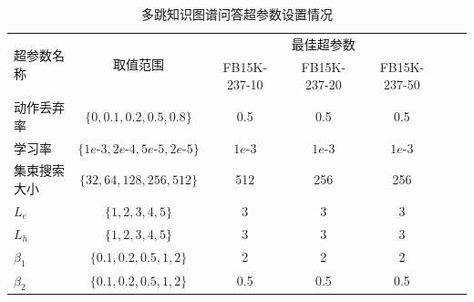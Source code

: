 \documentclass[algorithmlist, AutoFakeBold, AutoFakeSlant, figurelist, tablelist, nomlist, masters]{seuthesix}
\begin{document}
\begin{table}[]
  \centering
  \begin{tabular*}{0.95\textwidth}{@{\extracolsep{\fill}}lcccccc}
  \toprule[1pt]
  \multirow{2}{*}{超参数名称} & \multirow{2}{*}{取值范围} & \multicolumn{3}{c}{最佳超参数}\\ 
    &  & \small{FB15K-237-10} & \small{FB15K-237-20} & \small{FB15K-237-50} \\ \hline
  动作丢弃率 & $\{0, 0.1, 0.2, 0.5, 0.8\}$ & 0.5 & 0.5 & 0.5 \\
  学习率 & $\{1e\text{-}3, 2e\text{-}4, 5e\text{-}5, 2e\text{-}5\}$ & $1e\text{-}3$ & $1e\text{-}3$ & $1e\text{-}3$ \\
  集束搜索大小 & $\{32, 64, 128, 256, 512\}$ & 512 & 256 & 256 \\
  $L_e$ & $\{1, 2, 3, 4, 5\}$ & 3 & 3 & 3 \\
  $L_h$ & $\{1, 2, 3, 4, 5\}$ & 3 & 3 & 3 \\
  $\beta_1$ & $\{0.1, 0.2, 0.5, 1, 2\}$ & 2 & 2 & 2 \\
  $\beta_2$ & $\{0.1, 0.2, 0.5, 1, 2\}$ & 0.5 & 0.5 & 0.5 \\
  \bottomrule[1pt]
  \end{tabular*}
  \caption{多跳知识图谱问答超参数设置情况}
  \label{Hyperparameters2_Multihop}
\end{table}

\end{document}
